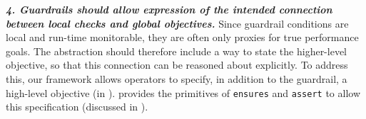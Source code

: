 \medskip\noindent
{\it \textbf{4. Guardrails should allow expression of the intended connection between local checks and global objectives.}}
Since guardrail conditions are local and run-time monitorable, they are often only proxies for true performance goals. The abstraction should therefore include a way to state the higher-level objective, so that this connection can be reasoned about explicitly. To address this, our framework allows operators to specify, in addition to the guardrail, a high-level objective (\perfsafety in ). \lang provides the primitives of {\tt ensures} and {\tt assert} to allow this specification (discussed in ).



